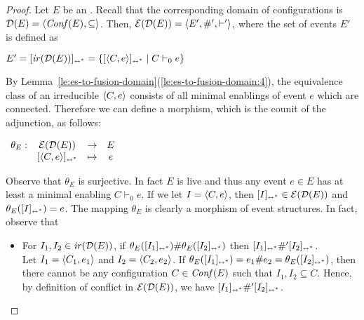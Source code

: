 \begin{proof}
  Let ${E}$ be an {\esabbr}. Recall that the corresponding domain of
  configurations is
  $\mathcal{D}({{E}}) = \langle \mathit{Conf}({{E}}), \subseteq \rangle$.  Then,
  $\mathcal{E}({\mathcal{D}({{E}})}) = \langle E', \#', \vdash'\rangle$, where the set of
  events $E'$ is defined as
  \begin{center}
    $E' = [{\mathop{\mathit{ir}({\mathcal{D}({{E}})})}}]_{\scriptscriptstyle {\leftrightarrow^*}} = \{ [{\langle{C}, {e}\rangle}]_{\scriptscriptstyle {\leftrightarrow^*}} \mid C
    \vdash_0 e \}$
  \end{center}
  
  By
  Lemma~\ref{le:es-to-fusion-domain}(\ref{le:es-to-fusion-domain:4}),
  the equivalence class of an irreducible $\langle{C}, {e}\rangle$ consists of
  all minimal enablings of event $e$ which are connected. Therefore we
  can define a morphism, which is the counit of the adjunction, as follows:
  \begin{center}
    $\begin{array}{lccc}
       \theta_{{E}} : & \mathcal{E}({\mathcal{D}({{E}})}) &  \to & {E}\\
                             & [{\langle{C}, {e}\rangle}]_{\scriptscriptstyle {\leftrightarrow^*}}
                             & \mapsto & e
     \end{array}
     $
  \end{center}
  Observe that $\theta_{{E}}$ is surjective. In fact ${E}$ is live and
  thus any event $e \in E$ has at least a minimal enabling
  $C \vdash_0 e$. If we let $I = \langle{C}, {e}\rangle$, then
  $[{I}]_{\scriptscriptstyle {\leftrightarrow^*}} \in \mathcal{E}({\mathcal{D}({{E}})})$ and $\theta_{{E}}([{I}]_{\scriptscriptstyle {\leftrightarrow^*}}) = e$.
  The mapping $\theta_E$ is clearly
  a  morphism of event structures. In fact, observe that
  \begin{itemize}
  
  \item For 
  $I_1, I_2 \in \mathop{\mathit{ir}({\mathcal{D}({{E}})})}$, if
    $\theta_{{E}}([{I_1}]_{\scriptscriptstyle {\leftrightarrow^*}}) \#
    \theta_{{E}}([{I_2}]_{\scriptscriptstyle {\leftrightarrow^*}})$
    then $[{I_1}]_{\scriptscriptstyle {\leftrightarrow^*}} \#' [{I_2}]_{\scriptscriptstyle {\leftrightarrow^*}}$.\\
    Let $I_1 = \langle{C_1}, {e_1}\rangle$ and $I_2 = \langle{C_2}, {e_2}\rangle$. If
    $\theta_{{E}}([{I_1}]_{\scriptscriptstyle {\leftrightarrow^*}}) = e_1 \# e_2 =
    \theta_{{E}}([{I_2}]_{\scriptscriptstyle {\leftrightarrow^*}})$, then there cannot be any
    configuration $C \in \mathit{Conf}({{E}})$ such that $I_1, I_2 \subseteq
    C$. Hence, by definition of conflict in $\mathcal{E}({\mathcal{D}({{E}})})$, we have
    $[{I_1}]_{\scriptscriptstyle {\leftrightarrow^*}} \#' [{I_2}]_{\scriptscriptstyle {\leftrightarrow^*}}$.


\end{itemize}
\end{proof}
